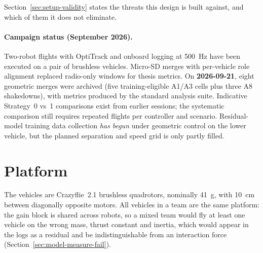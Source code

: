 Section~\ref{sec:setup-validity} states the threats this design is built against, and which of
them it does not eliminate.

\paragraph{Campaign status (September 2026).}
Two-robot flights with OptiTrack and onboard logging at \SI{500}{\hertz} have been executed on
a pair of brushless vehicles. Micro-SD merges with per-vehicle role alignment replaced radio-only
windows for thesis metrics. On \textbf{2026-09-21}, eight geometric merges were archived (five
training-eligible A1/A3 cells plus three A8 shakedowns), with metrics produced by the standard
analysis suite. Indicative Strategy~0 vs~1 comparisons exist from earlier sessions; the systematic
comparison still requires repeated flights per controller and scenario. Residual-model training
data collection \emph{has begun} under geometric control on the lower vehicle, but the planned
separation and speed grid is only partly filled.

\section{Platform}
\label{sec:setup-platform}

The vehicles are Crazyflie~2.1 brushless quadrotors, nominally \SI{41}{\gram}, with
\SI{10}{\centi\metre} between diagonally opposite motors. All vehicles in a team are the same platform: the gain block
is shared across robots, so a mixed team would fly at least one vehicle on the wrong mass, thrust
constant and inertia, which would appear in the logs as a residual and be indistinguishable from
an interaction force (Section~\ref{sec:model-measure-fail}).

